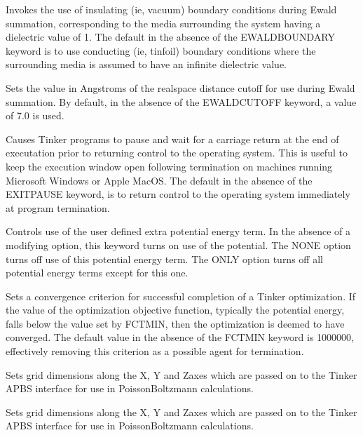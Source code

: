 \documentclass[letterpaper,11pt,english]{sphinxmanual}
\begin{document}
  Invokes the use of insulating (ie, vacuum) boundary conditions during Ewald summation, corresponding to the media surrounding the system having a dielectric value of 1. The default in the absence of the EWALD\sphinxhyphen{}BOUNDARY keyword is to use conducting (ie, tinfoil) boundary conditions where the surrounding media is assumed to have an infinite dielectric value.

  Sets the value in Angstroms of the real\sphinxhyphen{}space distance cutoff for use during Ewald summation. By default, in the absence of the EWALD\sphinxhyphen{}CUTOFF keyword, a value of 7.0 is used.

  Causes Tinker programs to pause and wait for a carriage return at the end of executation prior to returning control to the operating system. This is useful to keep the execution window open following termination on machines running Microsoft Windows or Apple MacOS. The default in the absence of the EXIT\sphinxhyphen{}PAUSE keyword, is to return control to the operating system immediately at program termination.

  Controls use of the user defined extra potential energy term. In the absence of a modifying option, this keyword turns on use of the potential. The NONE option turns off use of this potential energy term. The ONLY option turns off all potential energy terms except for this one.

  Sets a convergence criterion for successful completion of a Tinker optimization. If the value of the optimization objective function, typically the potential energy, falls below the value set by FCTMIN, then the optimization is deemed to have converged. The default value in the absence of the FCTMIN keyword is \sphinxhyphen{}1000000, effectively removing this criterion as a possible agent for termination.


  Sets grid dimensions along the X\sphinxhyphen{}, Y\sphinxhyphen{} and Z\sphinxhyphen{}axes which are passed on to the Tinker APBS interface for use in Poisson\sphinxhyphen{}Boltzmann calculations.

  Sets grid dimensions along the X\sphinxhyphen{}, Y\sphinxhyphen{} and Z\sphinxhyphen{}axes which are passed on to the Tinker APBS interface for use in Poisson\sphinxhyphen{}Boltzmann calculations.
\end{document}
